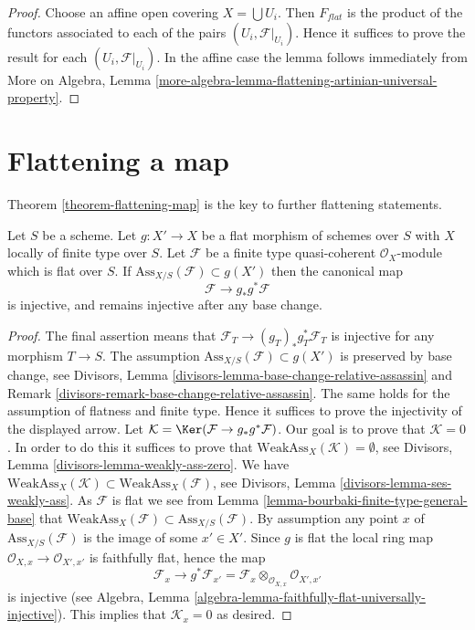 \begin{proof}
Choose an affine open covering $X = \bigcup U_i$.
Then $F_{flat}$ is the product of the functors associated to
each of the pairs $(U_i, \mathcal{F}|_{U_i})$.
Hence it suffices to prove the result for each
$(U_i, \mathcal{F}|_{U_i})$.
In the affine case the lemma follows immediately from
More on Algebra,
Lemma \ref{more-algebra-lemma-flattening-artinian-universal-property}.
\end{proof}






\section{Flattening a map}
\label{section-flattening-map}

\noindent
Theorem \ref{theorem-flattening-map}
is the key to further flattening statements.

\begin{lemma}
\label{lemma-universally-separating}
Let $S$ be a scheme.
Let $g : X' \to X$ be a flat morphism of schemes over $S$
with $X$ locally of finite type over $S$.
Let $\mathcal{F}$ be a finite type quasi-coherent $\mathcal{O}_X$-module
which is flat over $S$. If $\text{Ass}_{X/S}(\mathcal{F}) \subset g(X')$
then the canonical map
$$
\mathcal{F} \longrightarrow g_*g^*\mathcal{F}
$$
is injective, and remains injective after any base change.
\end{lemma}

\begin{proof}
The final assertion means that $\mathcal{F}_T \to (g_T)_*g_T^*\mathcal{F}_T$
is injective for any morphism $T \to S$. The assumption
$\text{Ass}_{X/S}(\mathcal{F}) \subset g(X')$ is preserved by base change, see
Divisors, Lemma \ref{divisors-lemma-base-change-relative-assassin} and
Remark \ref{divisors-remark-base-change-relative-assassin}.
The same holds for the assumption of flatness and finite type.
Hence it suffices to prove the injectivity of the displayed arrow.
Let $\mathcal{K} = \Ker(\mathcal{F} \to g_*g^*\mathcal{F})$.
Our goal is to prove that $\mathcal{K} = 0$.
In order to do this it suffices to prove that
$\text{WeakAss}_X(\mathcal{K}) = \emptyset$, see
Divisors, Lemma \ref{divisors-lemma-weakly-ass-zero}.
We have
$\text{WeakAss}_X(\mathcal{K}) \subset \text{WeakAss}_X(\mathcal{F})$, see
Divisors, Lemma \ref{divisors-lemma-ses-weakly-ass}.
As $\mathcal{F}$ is flat we see from
Lemma \ref{lemma-bourbaki-finite-type-general-base}
that $\text{WeakAss}_X(\mathcal{F}) \subset \text{Ass}_{X/S}(\mathcal{F})$.
By assumption any point $x$ of $\text{Ass}_{X/S}(\mathcal{F})$
is the image of some $x' \in X'$. Since $g$ is flat the
local ring map $\mathcal{O}_{X, x} \to \mathcal{O}_{X', x'}$
is faithfully flat, hence the map
$$
\mathcal{F}_x
\longrightarrow
g^*\mathcal{F}_{x'} =
\mathcal{F}_x \otimes_{\mathcal{O}_{X, x}} \mathcal{O}_{X', x'}
$$
is injective (see
Algebra, Lemma \ref{algebra-lemma-faithfully-flat-universally-injective}).
This implies that $\mathcal{K}_x = 0$ as desired.
\end{proof}

